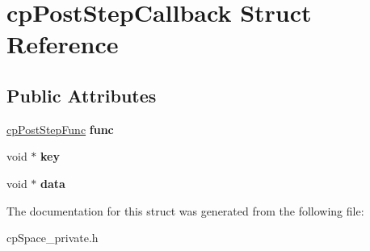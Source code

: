 \hypertarget{structcp_post_step_callback}{}\section{cp\+Post\+Step\+Callback Struct Reference}
\label{structcp_post_step_callback}
\subsection*{Public Attributes}
\begin{DoxyCompactItemize}
\item 
\hypertarget{structcp_post_step_callback_a0733e08f69a9b0c993ca16b31ce2d2b8}{}\hyperlink{group__cp_space_ga93e9005e387fec86eeb4a225ac295a23}{cp\+Post\+Step\+Func} {\bfseries func}\label{structcp_post_step_callback_a0733e08f69a9b0c993ca16b31ce2d2b8}

\item 
\hypertarget{structcp_post_step_callback_aab8cd0fa6eb37c3df6e946075abe9cc1}{}void $\ast$ {\bfseries key}\label{structcp_post_step_callback_aab8cd0fa6eb37c3df6e946075abe9cc1}

\item 
\hypertarget{structcp_post_step_callback_aa781c6dea369d312674f5dc78d090017}{}void $\ast$ {\bfseries data}\label{structcp_post_step_callback_aa781c6dea369d312674f5dc78d090017}

\end{DoxyCompactItemize}


The documentation for this struct was generated from the following file\+:\begin{DoxyCompactItemize}
\item 
cp\+Space\+\_\+private.\+h\end{DoxyCompactItemize}
